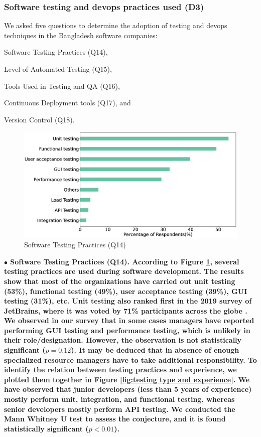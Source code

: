 \subsubsection{Software testing and devops practices used (D3)}
\label{testing_practices}
% 
We asked five questions to determine the adoption of testing and devops techniques in the Bangladesh software companies:
\begin{inparaenum}
\item Software Testing Practices (Q14),
\item Level of Automated Testing (Q15),
\item Tools Used in Testing and QA (Q16),
\item Continuous Deployment tools (Q17), and
\item Version Control (Q18).
\end{inparaenum}

\begin{figure}[h]
\centering
  \includegraphics[scale=0.2]{Figures/Respondents_testing_practices}
  \caption{Software Testing Practices (Q14)}
  \label{fig:testing}
\end{figure}
\nd\bf{$\bullet$ Software Testing Practices (Q14)}. According to Figure \ref{fig:testing}, several testing practices are used during
software development. The results show that most of the organizations have
carried out unit testing (53\%), functional testing (49\%), user acceptance
testing (39\%), GUI testing (31\%), etc. Unit testing also ranked first in the
2019 survey of JetBrains, where it was voted by 71\% participants across the
globe \citep{JetBrains2019}. We observed in our survey that in some cases
managers have reported performing GUI testing and performance testing, which is
unlikely in their role/designation. However, the observation is not
statistically significant ($p=0.12$). It may be deduced that in absence of
enough specialized resource managers have to take additional responsibility. To
identify the relation between testing practices and experience, we plotted them
together in Figure \ref{fig:testing type and experience}. We have observed that
junior developers (less than 5 years of experience) mostly perform unit, integration, and functional testing,
whereas senior developers mostly perform API testing. We conducted the Mann
Whitney U test to assess the conjecture, and it is found statistically
significant ($p<0.01$).

